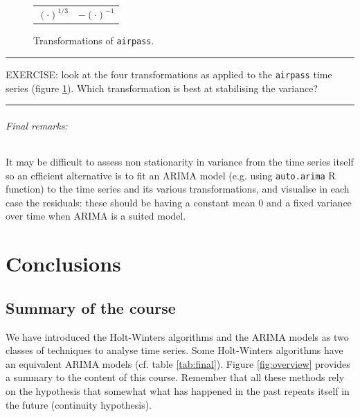 \documentclass[a4paper,11pt,oneside,onecolumn]{book}
\begin{document}
\begin{figure}[!h]
\begin{center}
\begin{tabular}{cc}
 $(\cdot)^{1/3}$&
$-(\cdot)^{-1}$\\
\end{tabular}
\caption{Transformations of \texttt{airpass}.}
\label{fig:airpass:transf}
\end{center}
\end{figure}


\newpage

\noindent\rule[.15 cm]{\linewidth}{.01 cm}

\noindent EXERCISE: look at the four transformations as applied to
the \texttt{airpass} time series (figure \ref{fig:airpass:transf}). Which transformation is best at
stabilising the variance?

\noindent\rule[.15 cm]{\linewidth}{.01 cm}


\paragraph{Final remarks:} It may be difficult to assess non stationarity in variance from the time series itself so an efficient alternative is to fit an ARIMA model (e.g. using \texttt{auto.arima} R function) to the time series and its various transformations,  and visualise in each case the residuals: these should be  having a constant mean 0 and a fixed variance over time when ARIMA is a suited model. 


\part{Conclusions}




\chapter{Summary of the course}

We have introduced the Holt-Winters algorithms and the ARIMA models as two classes of techniques to analyse time series. Some Holt-Winters algorithms have an equivalent ARIMA models (cf. table \ref{tab:final}).  Figure \ref{fig:overview} provides a summary to the content of this course. Remember that all these methods rely on the hypothesis that somewhat what has happened in the past repeats itself in the future (continuity hypothesis).
\end{document}
